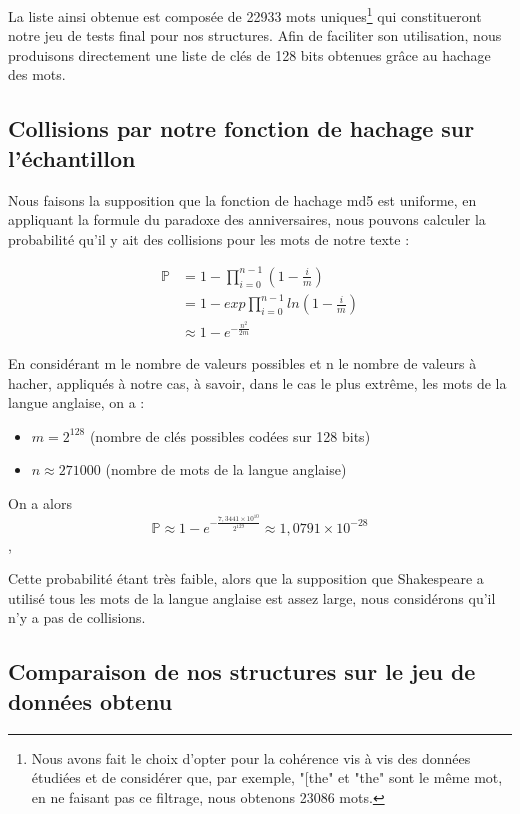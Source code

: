 \documentclass[12pt,a4paper]{article}
\begin{document}
La liste ainsi obtenue est composée de 22933 mots uniques\footnote{Nous avons fait le choix d'opter pour la cohérence vis à vis des données étudiées et de considérer que, par exemple, "[the" et "the" sont le même mot, en ne faisant pas ce filtrage, nous obtenons 23086 mots.} qui constitueront notre jeu de tests final pour nos structures. Afin de faciliter son utilisation, nous produisons directement une liste de clés de 128 bits obtenues grâce au hachage des mots. 

\subsection{Collisions par notre fonction de hachage sur l'échantillon}


Nous faisons la supposition que la fonction de hachage md5 est uniforme, en appliquant la formule du paradoxe des anniversaires, nous pouvons calculer la probabilité qu'il y ait des collisions pour les mots de notre texte :

\begin{align}
\mathbb{P} &= 1 - \prod_{i = 0}^{n -1} ( 1 - \frac{i}{m})\\
&= 1 - exp \prod_{i = 0}^{n -1} ln( 1 - \frac{i}{m})\\
&\approx 1 - e^{-\frac{n^2}{2m}}
\end{align}

En considérant m le nombre de valeurs possibles et n le nombre de valeurs à hacher, appliqués à notre cas, à savoir, dans le cas le plus extrême, les mots de la langue anglaise, on a :

\begin{itemize}
\item $m = 2^{128}$ (nombre de clés possibles codées sur 128 bits)
\item $n \approx 271000$ (nombre de mots de la langue anglaise)
\end{itemize}

On a alors 
$$\mathbb{P}\approx 1 - e^{-\frac{7,3441\times10^{10}}{2^{129}}} \approx 1,0791\times10^{-28}$$,

Cette probabilité étant très faible, alors que la supposition que Shakespeare a utilisé tous les mots de la langue anglaise est assez large, nous considérons qu'il n'y a pas de collisions.

\subsection{Comparaison de nos structures sur le jeu de données obtenu}
\end{document}
